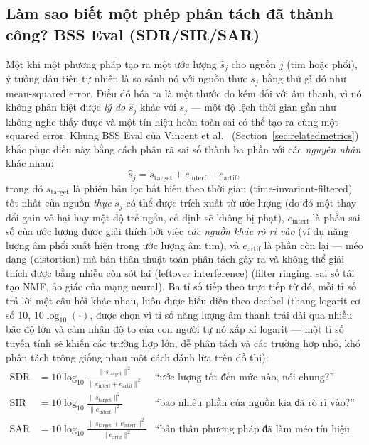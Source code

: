 \documentclass[11pt]{article}
\begin{document}
\subsection{Làm sao biết một phép phân tách đã thành công? BSS Eval (SDR/SIR/SAR)}
\label{sec:bg-bsseval}

Một khi một phương pháp tạo ra một ước lượng $\hat s_j$ cho nguồn $j$ (tim
hoặc phổi), ý tưởng đầu tiên tự nhiên là so sánh nó với nguồn thực $s_j$
bằng thứ gì đó như mean-squared error. Điều đó hóa ra là một thước đo kém
đối với âm thanh, vì nó không phân biệt được \emph{lý do} $\hat s_j$ khác
với $s_j$ --- một độ lệch thời gian gần như không nghe thấy được và một
tín hiệu hoàn toàn sai có thể tạo ra cùng một squared error. Khung BSS Eval
của Vincent et al.\ \cite{vincent2006} (Section~\ref{sec:relatedmetrics})
khắc phục điều này bằng cách phân rã sai số thành ba phần với các
\emph{nguyên nhân} khác nhau:
\begin{equation}
\hat s_j = s_{\text{target}} + e_{\text{interf}} + e_{\text{artif}},
\end{equation}
trong đó $s_{\text{target}}$ là phiên bản lọc bất biến theo thời gian
(time-invariant-filtered) tốt nhất của nguồn \emph{thực} $s_j$ có thể được
trích xuất từ ước lượng (do đó một thay đổi gain vô hại hay một độ trễ
ngắn, cố định sẽ không bị phạt), $e_{\text{interf}}$ là phần sai số của
ước lượng được giải thích bởi việc \emph{các nguồn khác rò rỉ vào}
(ví dụ năng lượng âm phổi xuất hiện trong ước lượng âm tim), và
$e_{\text{artif}}$ là phần còn lại --- méo dạng (distortion) mà bản thân
thuật toán phân tách gây ra và không thể giải thích được bằng nhiễu còn
sót lại (leftover interference) (filter ringing, sai số tái tạo NMF, ảo
giác của mạng neural). Ba tỉ số tiếp theo trực tiếp từ đó, mỗi tỉ số trả
lời một câu hỏi khác nhau, luôn được biểu diễn theo decibel (thang
logarit cơ số 10, $10\log_{10}(\cdot)$, được chọn vì tỉ số năng lượng âm
thanh trải dài qua nhiều bậc độ lớn và cảm nhận độ to của con người tự nó
xấp xỉ logarit --- một tỉ số tuyến tính sẽ khiến các trường hợp lớn, dễ
phân tách và các trường hợp nhỏ, khó phân tách trông giống nhau một cách
đánh lừa trên đồ thị):
\begin{align}
\text{SDR} &= 10\log_{10}\frac{\lVert s_{\text{target}} \rVert^2}
  {\lVert e_{\text{interf}} + e_{\text{artif}} \rVert^2}
  &\text{``ước lượng tốt đến mức nào, nói chung?''} \\
\text{SIR} &= 10\log_{10}\frac{\lVert s_{\text{target}} \rVert^2}
  {\lVert e_{\text{interf}} \rVert^2}
  &\text{``bao nhiêu phần của nguồn kia đã rò rỉ vào?''} \\
\text{SAR} &= 10\log_{10}\frac{\lVert s_{\text{target}} + e_{\text{interf}} \rVert^2}
  {\lVert e_{\text{artif}} \rVert^2}
  &\text{``bản thân phương pháp đã làm méo tín hiệu bao nhiêu?''}
\end{align}
\end{document}
